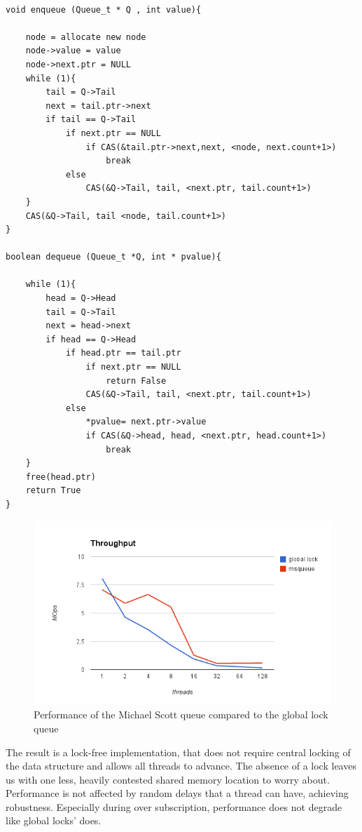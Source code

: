 \begin{lstlisting}

void enqueue (Queue_t * Q , int value){
	
	node = allocate new node
	node->value = value
	node->next.ptr = NULL
	while (1){
		tail = Q->Tail
		next = tail.ptr->next
		if tail == Q->Tail
			if next.ptr == NULL
				if CAS(&tail.ptr->next,next, <node, next.count+1>)
					break
			else
				CAS(&Q->Tail, tail, <next.ptr, tail.count+1>)  
	}				
	CAS(&Q->Tail, tail <node, tail.count+1>)	
}

boolean dequeue (Queue_t *Q, int * pvalue){
	
	while (1){
		head = Q->Head
		tail = Q->Tail
		next = head->next
		if head == Q->Head
			if head.ptr == tail.ptr
				if next.ptr == NULL
					return False
				CAS(&Q->Tail, tail, <next.ptr, tail.count+1>)
			else
				*pvalue= next.ptr->value
				if CAS(&Q->head, head, <next.ptr, head.count+1>)
					break
	}
	free(head.ptr)
	return True
}

\end{lstlisting}

\begin{figure}
 \centering
  \includegraphics[scale=0.7]{queue_msqueue_perf.png}
 \caption{ Performance of the Michael Scott queue compared to the global lock queue}
\label{queue_msqueue_perf}
\end{figure}

The result is a lock-free implementation,  that does not require central locking of the data structure and allows all threads to advance. The absence of a lock leaves us with one less, heavily contested shared memory location to worry about. Performance is not affected by random delays that a thread can have, achieving robustness. Especially during over subscription, performance does not degrade like global locks' does.

